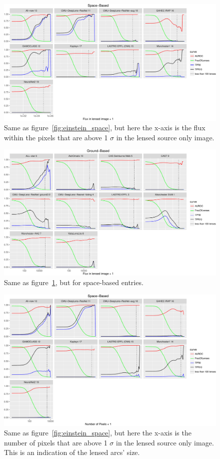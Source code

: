 \documentclass{aa}
\begin{document}
\begin{figure}
 \includegraphics[width=2\columnwidth]{figures/flux_space.pdf}
 \caption{Same as figure~\ref{fig:einstein_space}, but here the x-axis is the flux within the pixels that are above 1 $\sigma$ in the lensed source only image.}
 \label{fig:flux_space}
\end{figure}

\begin{figure}
 \includegraphics[width=2\columnwidth]{figures/flux_ground.pdf}
 \caption{Same as figure~\ref{fig:flux_space}, but for space-based entries.}
 \label{fig:flux_ground}
\end{figure}

\begin{figure}
\includegraphics[width=2\columnwidth]{figures/npixel_space.pdf}
 \caption{Same as figure~\ref{fig:einstein_space}, but here the x-axis is the number of pixels that are above 1 $\sigma$ in the lensed source only image.  This is an indication of the lensed arcs' size.}
 \label{fig:npixel_space}
\end{figure}
\end{document}
